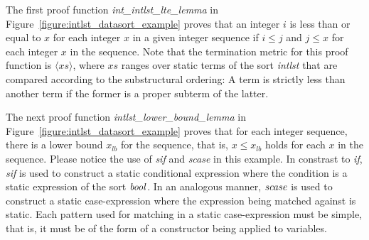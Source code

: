 The first proof function {\it int\_intlst\_lte\_lemma} in
Figure~\ref{figure:intlst_datasort_example} proves that an integer $i$ is
less than or equal to $x$ for each integer $x$ in a given integer sequence
if $i\leq j$ and $j\leq x$ for each integer $x$ in the sequence. Note that
the termination metric for this proof function is $\langle xs\rangle$,
where $xs$ ranges over static terms of the sort {\it intlst} that are
compared according to the substructural ordering: A term is strictly less
than another term if the former is a proper subterm of the latter.

The next proof function {\it intlst\_lower\_bound\_lemma} in
Figure~\ref{figure:intlst_datasort_example} proves that for each integer
sequence, there is a lower bound $x_{lb}$ for the sequence, that is, $x\leq
x_{lb}$ holds for each $x$ in the sequence. Please notice the use of {\it
sif} and {\it scase} in this example. In constrast to {\it if}, {\it sif}
is used to construct a static conditional expression where the condition is
a static expression of the sort ${\it bool}$. In an analogous manner, ${\it
scase}$ is used to construct a static case-expression where the expression
being matched against is static. Each pattern used for matching in a static
case-expression must be simple, that is, it must be of the form of a
constructor being applied to variables.


